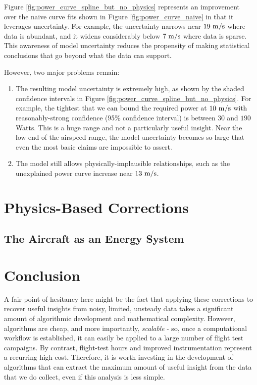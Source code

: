 \documentclass[conf]{new-aiaa}
\begin{document}
    Figure \ref{fig:power_curve_spline_but_no_physics} represents an improvement over the naive curve fits shown in Figure \ref{fig:power_curve_naive} in that it leverages uncertainty. For example, the uncertainty narrows near $19\ \rm m/s$ where data is abundant, and it widens considerably below $7\ \rm m/s$ where data is sparse. This awareness of model uncertainty reduces the propensity of making statistical conclusions that go beyond what the data can support.

    However, two major problems remain:

    \begin{enumerate}
        \item The resulting model uncertainty is extremely high, as shown by the shaded confidence intervals in Figure \ref{fig:power_curve_spline_but_no_physics}. For example, the tightest that we can bound the required power at $10\ \rm m/s$ with reasonably-strong confidence (95\% confidence interval) is between $30$ and $190$ Watts. This is a huge range and not a particularly useful insight. Near the low end of the airspeed range, the model uncertainty becomes so large that even the most basic claims are impossible to assert.
        \item The model still allows physically-implausible relationships, such as the unexplained power curve increase near $13\ \rm m/s$.
    \end{enumerate}

    \section{Physics-Based Corrections}

    \subsection{The Aircraft as an Energy System}

    \section{Conclusion}

    A fair point of hesitancy here might be the fact that applying these corrections to recover useful insights from noisy, limited, unsteady data takes a significant amount of algorithmic development and mathematical complexity. However, algorithms are cheap, and more importantly, \emph{scalable} - so, once a computational workflow is established, it can easily be applied to a large number of flight test campaigns. By contrast, flight-test hours and improved instrumentation represent a recurring high cost. Therefore, it is worth investing in the development of algorithms that can extract the maximum amount of useful insight from the data that we do collect, even if this analysis is less simple.
\end{document}
